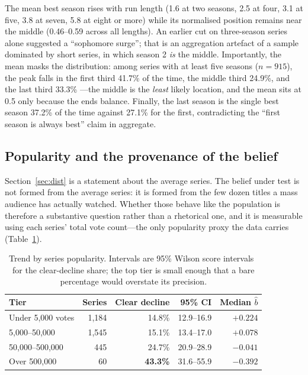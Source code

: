 \documentclass[11pt,a4paper]{article}
\begin{document}
The mean best season rises with run length (1.6 at two seasons, 2.5 at four,
3.1 at five, 3.8 at seven, 5.8 at eight or more) while its normalised position
remains near the middle (0.46--0.59 across all lengths). An earlier cut on
three-season series alone suggested a ``sophomore surge''; that is an
aggregation artefact of a sample dominated by short series, in which season 2
\emph{is} the middle. Importantly, the mean masks the distribution: among
series with at least five seasons ($n = 915$), the peak falls in the first
third 41.7\% of the time, the middle third 24.9\%, and the last third 33.3\%
---the middle is the \emph{least} likely location, and the mean sits at 0.5
only because the ends balance. Finally, the last season is the single best
season 37.2\% of the time against 27.1\% for the first, contradicting the
``first season is always best'' claim in aggregate.

\FloatBarrier
\subsection{Popularity and the provenance of the belief}
\label{sec:pop}

Section~\ref{sec:dist} is a statement about the average series. The belief under
test is not formed from the average series: it is formed from the few dozen
titles a mass audience has actually watched. Whether those behave like the
population is therefore a substantive question rather than a rhetorical one, and
it is measurable using each series' total vote count---the only popularity proxy
the data carries (Table~\ref{tab:pop}).

\begin{table}[htbp]
\centering
\small
\caption{Trend by series popularity. Intervals are 95\% Wilson score
intervals~\cite{wilson} for the clear-decline share; the top tier is small
enough that a bare percentage would overstate its precision.}
\label{tab:pop}
\begin{tabular}{lrrrr}
\toprule
\textbf{Tier} & \textbf{Series} & \textbf{Clear decline} & \textbf{95\% CI} &
\textbf{Median $\hat{b}$} \\
\midrule
Under 5,000 votes  & 1,184 & 14.8\% & 12.9--16.9 & $+0.224$ \\
5,000--50,000      & 1,545 & 15.1\% & 13.4--17.0 & $+0.078$ \\
50,000--500,000    &   445 & 24.7\% & 20.9--28.9 & $-0.041$ \\
Over 500,000       &    60 & \textbf{43.3\%} & 31.6--55.9 & $\mathbf{-0.392}$ \\
\bottomrule
\end{tabular}
\end{table}
\end{document}
